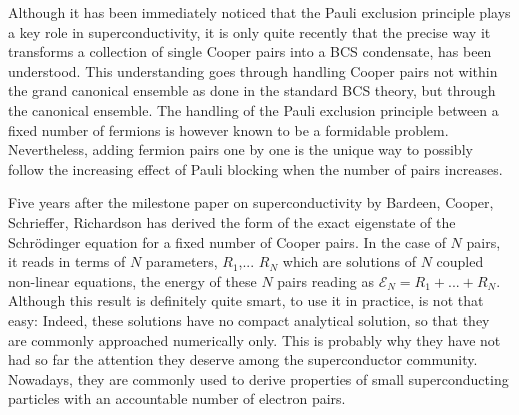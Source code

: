 \documentclass[aps,prb,amsmath,amssymb,preprint,superscriptaddress]{revtex4-1}
\renewcommand{\E}{\ensuremath{\mathcal{E}}}
\begin{document}
\pacs{}

\maketitle


Although it has been immediately noticed that the Pauli exclusion principle plays a key role in superconductivity, it is only quite recently that the precise way it transforms a collection of single Cooper pairs into a BCS condensate, has been understood.  This understanding goes through handling Cooper pairs not within the grand canonical ensemble as done in the standard BCS theory, but through the canonical ensemble.  The handling of the Pauli exclusion principle between a fixed number of fermions is however known to be a formidable problem.  Nevertheless, adding fermion pairs one by one is the unique way to possibly follow the increasing effect of Pauli blocking when the number of pairs increases. 

Five years after the milestone paper on superconductivity by Bardeen, Cooper, Schrieffer\cite{BCS}, Richardson has derived the form of the exact eigenstate of the Schr\"{o}dinger equation for a fixed number of Cooper pairs\cite{Richardson1,Richardson2}.  In the case of $N$ pairs, it reads in terms of $N$ parameters, $R_1$,...  $R_N$ which are solutions of $N$ coupled non-linear equations, the energy of these $N$ pairs reading as $\E_N=R_1+...+R_N$. Although this result is definitely quite smart, to use it in practice, is not that easy: Indeed, these solutions have no compact analytical solution, so that they are commonly approached numerically only. This is probably why they have not had so far the attention they deserve among the superconductor community.  Nowadays, they are commonly used to derive properties of small superconducting particles with an accountable number of electron pairs. 
\end{document}
